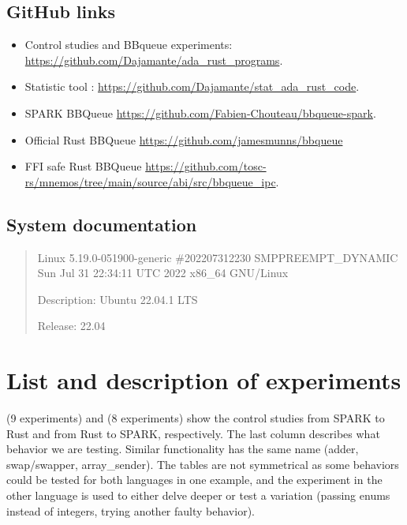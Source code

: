 \documentclass[nomenclature, english, bibtex]{kththesis}
\begin{document}
\subsection{GitHub links}
\label{sec:systemDocumentation}
\begin{itemize}
    \item Control studies and BBqueue experiments: 
        \url{https://github.com/Dajamante/ada_rust_programs}.
    \item Statistic tool : 
        \url{https://github.com/Dajamante/stat_ada_rust_code}.
    \item SPARK BBQueue 
        \url{https://github.com/Fabien-Chouteau/bbqueue-spark}.
    \item Official Rust BBQueue 
        \url{https://github.com/jamesmunns/bbqueue}
    \item FFI safe Rust BBQueue
        \url{https://github.com/tosc-rs/mnemos/tree/main/source/abi/src/bbqueue_ipc}.
\end{itemize}

\subsection{System documentation}

\begin{quote}
Linux 5.19.0-051900-generic \#202207312230 SMP\linebreak[4] PREEMPT\_DYNAMIC Sun Jul 31 22:34:11 UTC 2022 x86\_64 GNU/Linux

Description: Ubuntu 22.04.1 LTS

Release:	22.04
\end{quote}

\section{List and description of experiments}
\label{tab:listexperiments}

 (9 experiments) and  (8 experiments) show the control studies from SPARK to Rust and from Rust to SPARK,
respectively. The last column describes what behavior we are testing. Similar functionality has the same name (adder, swap/swapper, array\_sender). The tables are not symmetrical as some behaviors could be tested for both languages in one example, and the experiment in the other language is used to either delve deeper or test a variation (passing enums instead of integers, trying another faulty behavior).
\end{document}
